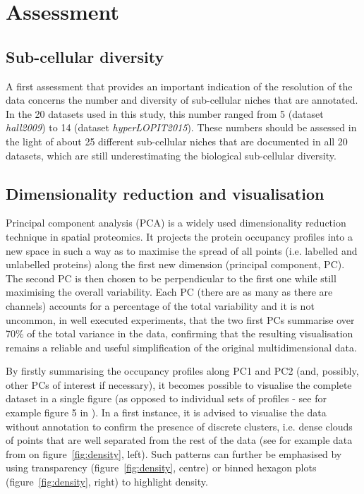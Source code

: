 \documentclass[12pt]{article}\usepackage[]{graphicx}\usepackage[]{color}
\begin{document}
\section{Assessment}

\subsection{Sub-cellular diversity}\label{sec:sub-cell-divers}

A first assessment that provides an important indication of the
resolution of the data concerns the number and diversity of
sub-cellular niches that are annotated. In the 20
datasets used in this study, this number ranged from
5 (dataset
\textit{hall2009}) to
14 (dataset
\textit{hyperLOPIT2015}). These numbers should be
assessed in the light of about 25 different sub-cellular niches that
are documented in all 20 datasets, which are still
underestimating the biological sub-cellular diversity.

\subsection{Dimensionality reduction and visualisation}\label{sec:vis}

Principal component analysis (PCA) is a widely used dimensionality
reduction technique in spatial proteomics. It projects the protein
occupancy profiles into a new space in such a way as to maximise the
spread of all points (i.e. labelled and unlabelled proteins) along the
first new dimension (principal component, PC). The second PC is then
chosen to be perpendicular to the first one while still maximising the
overall variability. Each PC (there are as many as there are
channels) accounts for a percentage of the total variability and it
is not uncommon, in well executed experiments, that the two first PCs
summarise over 70\% of the total variance in the data, confirming that
the resulting visualisation remains a reliable and useful
simplification of the original multidimensional data.

By firstly summarising the occupancy profiles along PC1 and PC2 (and,
possibly, other PCs of interest if necessary), it becomes
possible to visualise the complete dataset in a single figure (as
opposed to individual sets of profiles - see for example figure 5 in
\citet{Gatto:2010}). In a first instance, it is advised to visualise
the data without annotation to confirm the presence of discrete
clusters, i.e. dense clouds of points that are well separated from the
rest of the data (see for example data from \citet{Christoforou:2016}
on figure~\ref{fig:density}, left). Such patterns can further be
emphasised by using transparency (figure~\ref{fig:density}, centre) or
binned hexagon plots (figure~\ref{fig:density}, right) to highlight
density.
\end{document}

